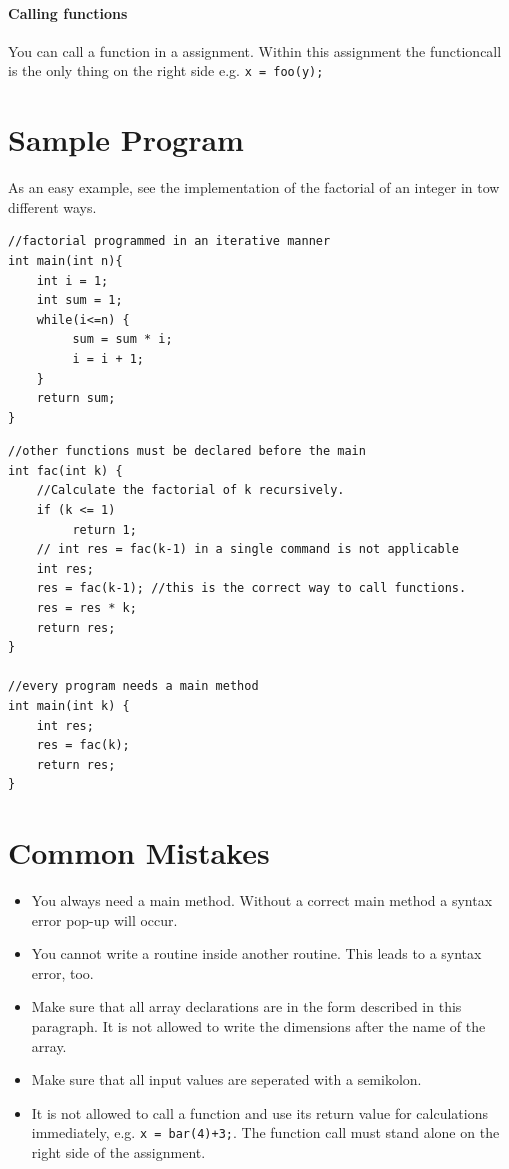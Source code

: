 \documentclass[parskip=full]{memoir}
\begin{document}
\paragraph{Calling functions}
You can call a function in a assignment. Within this assignment the functioncall is the only thing on the right side e.g. \texttt{x = foo(y);}
\section{Sample Program}
As an easy example, see the implementation of the factorial of an integer in tow different ways.
\begin{verbatim}
//factorial programmed in an iterative manner
int main(int n){
    int i = 1;
    int sum = 1;
    while(i<=n) {
         sum = sum * i;
         i = i + 1;
    }
    return sum;
}
\end{verbatim}
\begin{verbatim}
//other functions must be declared before the main
int fac(int k) {
    //Calculate the factorial of k recursively.
    if (k <= 1)
         return 1;
    // int res = fac(k-1) in a single command is not applicable
    int res;
    res = fac(k-1); //this is the correct way to call functions.
    res = res * k;
    return res;
}

//every program needs a main method
int main(int k) {
    int res;
    res = fac(k);
    return res;
}
\end{verbatim}
\section{Common Mistakes}
\begin{itemize}
\item You always need a main method. Without a correct main method a syntax error pop-up will occur.
\item You cannot write a routine inside another routine. This leads to a syntax error, too.
\item Make sure that all array declarations are in the form described in this paragraph. It is not allowed to write the dimensions after the name of the array.
\item Make sure that all input values are seperated with a semikolon.  
\item It is not allowed to call a function and use its return value for calculations immediately, e.g. \texttt{x = bar(4)+3;}. The function call must stand alone on the right side of the assignment. 
\end{itemize}
\end{document}
